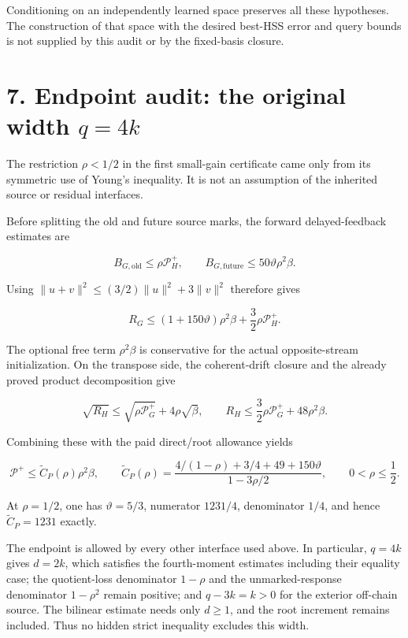 \documentclass[11pt,oneside,openany,a4paper]{book}
\numberwithin{equation}{chapter}
\theoremstyle{definition}
\theoremstyle{remark}
\begin{document}
Conditioning on an independently learned space preserves all these hypotheses. The construction of that space with the desired best-HSS error and query bounds is not supplied by this audit or by the fixed-basis closure.

\section{\texorpdfstring{7. Endpoint audit: the original width \(q=4k\)}{7. Endpoint audit: the original width q=4k}}\label{interfaces:endpoint-audit-the-original-width-q4k}

The restriction \(\rho<1/2\) in the first small-gain certificate came only from its symmetric use of Young's inequality. It is not an assumption of the inherited source or residual interfaces.

Before splitting the old and future source marks, the forward delayed-feedback estimates are

\[
B_{G,\mathrm{old}}\le \rho\mathcal P_H^+,\qquad
B_{G,\mathrm{future}}\le 50\vartheta\rho^2\beta .
\]

Using \(\|u+v\|^2\le(3/2)\|u\|^2+3\|v\|^2\) therefore gives

\[
R_G\le (1+150\vartheta)\rho^2\beta
       +\frac32\rho\mathcal P_H^+.
\]

The optional free term \(\rho^2\beta\) is conservative for the actual opposite-stream initialization. On the transpose side, the coherent-drift closure and the already proved product decomposition give

\[
\sqrt{R_H}\le\sqrt{\rho\mathcal P_G^+}+4\rho\sqrt\beta,
\qquad
R_H\le\frac32\rho\mathcal P_G^++48\rho^2\beta .
\]

Combining these with the paid direct/root allowance yields

\[
\mathcal P^+\le\widetilde C_P(\rho)\rho^2\beta,\qquad
\widetilde C_P(\rho)=
\frac{4/(1-\rho)+3/4+49+150\vartheta}{1-3\rho/2},
\qquad 0<\rho\le\frac12 .
\]

At \(\rho=1/2\), one has \(\vartheta=5/3\), numerator \(1231/4\), denominator \(1/4\), and hence \(\widetilde C_P=1231\) exactly.

The endpoint is allowed by every other interface used above. In particular, \(q=4k\) gives \(d=2k\), which satisfies the fourth-moment estimates including their equality case; the quotient-loss denominator \(1-\rho\) and the unmarked-response denominator \(1-\rho^2\) remain positive; and \(q-3k=k>0\) for the exterior off-chain source. The bilinear estimate needs only \(d\ge1\), and the root increment remains included. Thus no hidden strict inequality excludes this width.
\end{document}
